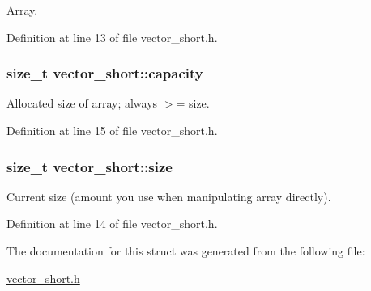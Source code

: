 Array. 



Definition at line 13 of file vector\-\_\-short.\-h.

\hypertarget{structvector__short_a06409947c0c59b65b52537c6bade6569}{
\subsubsection[{capacity}]{\setlength{\rightskip}{0pt plus 5cm}size\-\_\-t vector\-\_\-short\-::capacity}}\label{structvector__short_a06409947c0c59b65b52537c6bade6569}


Allocated size of array; always $>$= size. 



Definition at line 15 of file vector\-\_\-short.\-h.

\hypertarget{structvector__short_a40844e43099756849900956e128123a3}{
\subsubsection[{size}]{\setlength{\rightskip}{0pt plus 5cm}size\-\_\-t vector\-\_\-short\-::size}}\label{structvector__short_a40844e43099756849900956e128123a3}


Current size (amount you use when manipulating array directly). 



Definition at line 14 of file vector\-\_\-short.\-h.



The documentation for this struct was generated from the following file\-:\begin{DoxyCompactItemize}
\item 
\hyperlink{vector__short_8h}{vector\-\_\-short.\-h}\end{DoxyCompactItemize}
